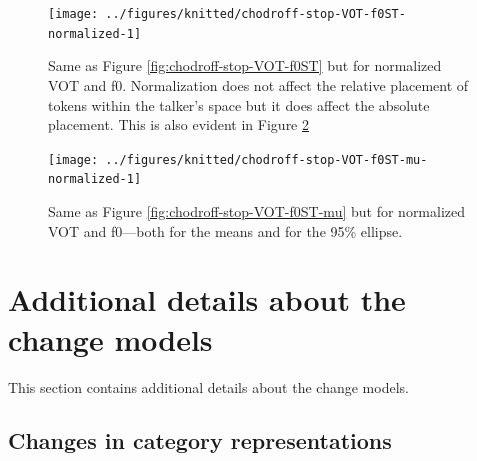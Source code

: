 \documentclass[
  11pt,
  man,floatsintext]{apa6}
\begin{document}
\begin{figure}

{\centering \texttt{[image: ../figures/knitted/chodroff-stop-VOT-f0ST-normalized-1]} 

}

\caption{Same as Figure \ref{fig:chodroff-stop-VOT-f0ST} but for normalized VOT and f0. Normalization does not affect the relative placement of tokens within the talker's space but it does affect the absolute placement. This is also evident in Figure \ref{fig:chodroff-stop-VOT-f0ST-mu-normalized}}\label{fig:chodroff-stop-VOT-f0ST-normalized}
\end{figure}



\begin{figure}

{\centering \texttt{[image: ../figures/knitted/chodroff-stop-VOT-f0ST-mu-normalized-1]} 

}

\caption{Same as Figure \ref{fig:chodroff-stop-VOT-f0ST-mu} but for normalized VOT and f0---both for the means and for the 95\% ellipse.}\label{fig:chodroff-stop-VOT-f0ST-mu-normalized}
\end{figure}

\hypertarget{sec:SI-models}{%
\section{Additional details about the change models}\label{sec:SI-models}}

This section contains additional details about the change models.

\hypertarget{sec:SI-models-changes-in-representations}{%
\subsection{Changes in category representations}\label{sec:SI-models-changes-in-representations}}
\end{document}
